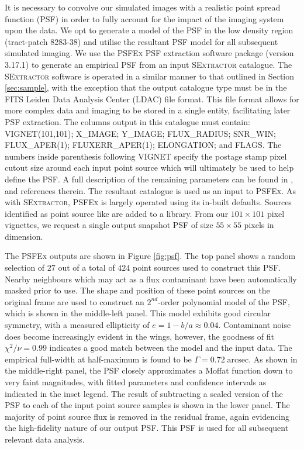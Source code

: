 \documentclass[fleqn,usenatbib,useAMS]{mnras}
\newcommand*{\SExtractor}{\textsc{SExtractor}\xspace}
\newcommand*{\PSFEx}{\textsc{PSFEx}\xspace}
\begin{document}
It is necessary to convolve our simulated images with a realistic point spread function (PSF) in order to fully account for the impact of the imaging system upon the data. We opt to generate a model of the PSF in the low density region (tract-patch 8283-38) and utilise the resultant PSF model for all subsequent simulated imaging. We use the \PSFEx \citep[][]{Bertin2011} PSF extraction software package (version 3.17.1) to generate an empirical PSF from an input \SExtractor catalogue. The \SExtractor software is operated in a similar manner to that outlined in Section \ref{sec:sample}, with the exception that the output catalogue type must be in the FITS Leiden Data Analysis Center (LDAC) file format. This file format allows for more complex data and imaging to be stored in a single entity, facilitating later PSF extraction. The columns output in this catalogue must contain: VIGNET(101,101); X\_IMAGE; Y\_IMAGE; FLUX\_RADIUS; SNR\_WIN; FLUX\_APER(1); FLUXERR\_APER(1); ELONGATION; and FLAGS. The numbers inside parenthesis following VIGNET specify the postage stamp pixel cutout size around each input point source which will ultimately be used to help define the PSF. A full description of the remaining parameters can be found in \citet{Bertin2011}, and references therein. The resultant catalogue is used as an input to \PSFEx. As with \SExtractor, \PSFEx is largely operated using its in-built defaults. Sources identified as point source like are added to a library. From our $101\times101$ pixel vignettes, we request a single output snapshot PSF of size $55\times55$ pixels in dimension. 

The \PSFEx outputs are shown in Figure \ref{fig:psf}. The top panel shows a random selection of $27$ out of a total of $424$ point sources used to construct this PSF. Nearby neighbours which may act as a flux contaminant have been automatically masked prior to use. The shape and position of these point sources on the original frame are used to construct an $\mathrm{2}^{nd}$-order polynomial model of the PSF, which is shown in the middle-left panel. This model exhibits good circular symmetry, with a measured ellipticity of $e=1-b/a\approx0.04$. Contaminant noise does become increasingly evident in the wings, however, the goodness of fit $\chi^2/\nu=0.99$ indicates a good match between the model and the input data. The empirical full-width at half-maximum is found to be $\Gamma=0.72\;\mathrm{arcsec}$. As shown in the middle-right panel, the PSF closely approximates a Moffat function down to very faint magnitudes, with fitted parameters and confidence intervals as indicated in the inset legend. The result of subtracting a scaled version of the PSF to each of the input point source samples is shown in the lower panel. The majority of point source flux is removed in the residual frame, again evidencing the high-fidelity nature of our output PSF. This PSF is used for all subsequent relevant data analysis. 
\end{document}
